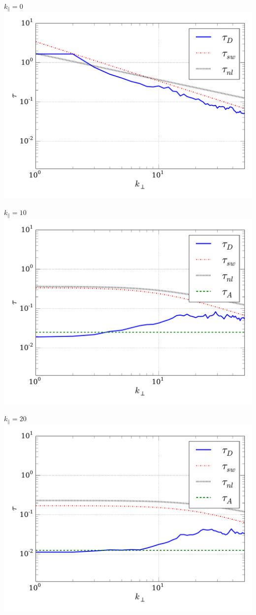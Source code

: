 \documentclass[rodrigo]{wtpc-beamer}
\begin{document}
{  \centering  
  \begin{minipage}[t]{0.49\textwidth}
    \begin{center}
      $k_\parallel = 0$\\
      \includegraphics[width=0.7\columnwidth]{figs/fig5_B8_b_kpara_0.pdf}
    \end{center}
  \end{minipage}
  \begin{minipage}[t]{0.49\textwidth}
    \begin{center}
      $k_\parallel = 10$\\
      \includegraphics[width=0.7\columnwidth]{figs/fig5_B8_b_kpara_10.pdf}
    \end{center}
  \end{minipage}
  \begin{minipage}[t]{0.49\textwidth}
    \begin{center}
      $k_\parallel = 20$\\
      \includegraphics[width=0.7\columnwidth]{figs/fig5_B8_b_kpara_20.pdf}
    \end{center}
  \end{minipage}
}




\frame{\titlepage}
\end{document}
